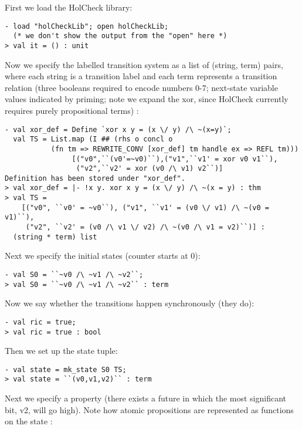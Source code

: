 \documentclass[12pt,fleqn]{article}
\newcommand{\hc}{HolCheck}
\begin{document}
First we load the \hc{} library:
\begin{session}\begin{verbatim}
- load "holCheckLib"; open holCheckLib;
  (* we don't show the output from the "open" here *)
> val it = () : unit
\end{verbatim}\end{session}
Now we specify the labelled transition system as a list of
(string, term) pairs, where each string is a transition label and
each term represents a transition relation (three booleans
required to encode numbers 0-7; next-state variable values
indicated by priming; note we expand the xor, since \hc{}
currently requires purely propositional terms) :
\begin{session}\begin{verbatim}
- val xor_def = Define `xor x y = (x \/ y) /\ ~(x=y)`;
  val TS = List.map (I ## (rhs o concl o
           (fn tm => REWRITE_CONV [xor_def] tm handle ex => REFL tm)))
                [("v0",``(v0'=~v0)``),("v1",``v1' = xor v0 v1``),
                 ("v2",``v2' = xor (v0 /\ v1) v2``)]
Definition has been stored under "xor_def".
> val xor_def = |- !x y. xor x y = (x \/ y) /\ ~(x = y) : thm
> val TS =
    [("v0", ``v0' = ~v0``), ("v1", ``v1' = (v0 \/ v1) /\ ~(v0 = v1)``),
     ("v2", ``v2' = (v0 /\ v1 \/ v2) /\ ~(v0 /\ v1 = v2)``)] :
  (string * term) list
\end{verbatim}\end{session}
Next we specify the initial states (counter starts at 0):
\begin{session}\begin{verbatim}
- val S0 = ``~v0 /\ ~v1 /\ ~v2``;
> val S0 = ``~v0 /\ ~v1 /\ ~v2`` : term
\end{verbatim}\end{session}
Now we say whether the transitions happen synchronously (they do):
\begin{session}\begin{verbatim}
- val ric = true;
> val ric = true : bool
\end{verbatim}\end{session}
Then we set up the state tuple:
\begin{session}\begin{verbatim}
- val state = mk_state S0 TS;
> val state = ``(v0,v1,v2)`` : term
\end{verbatim}\end{session}
Next we specify a property (there exists a future in which the most significant bit, v2, will go high). Note how atomic propositions are represented as functions on the state :
\end{document}
